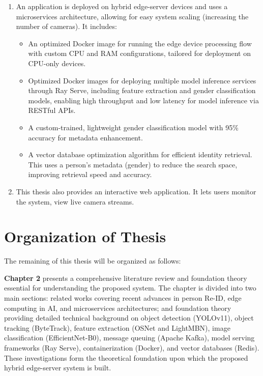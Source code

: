 \documentclass[../main.tex]{subfiles}
\begin{document}
\begin{enumerate}
    \item An application is deployed on hybrid edge-server devices and uses a microservices architecture, allowing for easy system scaling (increasing the number of cameras). It includes:
    \begin{itemize}
        \item An optimized Docker image for running the edge device processing flow with custom CPU and RAM configurations, tailored for deployment on CPU-only devices.
        \item Optimized Docker images for deploying multiple model inference services through Ray Serve, including feature extraction and gender classification models, enabling high throughput and low latency for model inference via RESTful APIs.
        \item A custom-trained, lightweight gender classification model with 95\% accuracy for metadata enhancement.
        \item A vector database optimization algorithm for efficient identity retrieval. This uses a person's metadata (gender) to reduce the search space, improving retrieval speed and accuracy.
    \end{itemize} 
\item This thesis also provides an interactive web application. It lets users monitor the system, view live camera streams.
\end{enumerate}

\section{Organization of Thesis}
\label{sec:organize}

The remaining of this thesis will be organized as follows:

\textbf{Chapter 2} presents a comprehensive literature review and foundation theory essential for understanding the proposed system. The chapter is divided into two main sections: related works covering recent advances in person Re-ID, edge computing in AI, and microservices architectures; and foundation theory providing detailed technical background on object detection (YOLOv11), object tracking (ByteTrack), feature extraction (OSNet and LightMBN), image classification (EfficientNet-B0), message queuing (Apache Kafka), model serving frameworks (Ray Serve), containerization (Docker), and vector databases (Redis). These investigations form the theoretical foundation upon which the proposed hybrid edge-server system is built.
\end{document}
